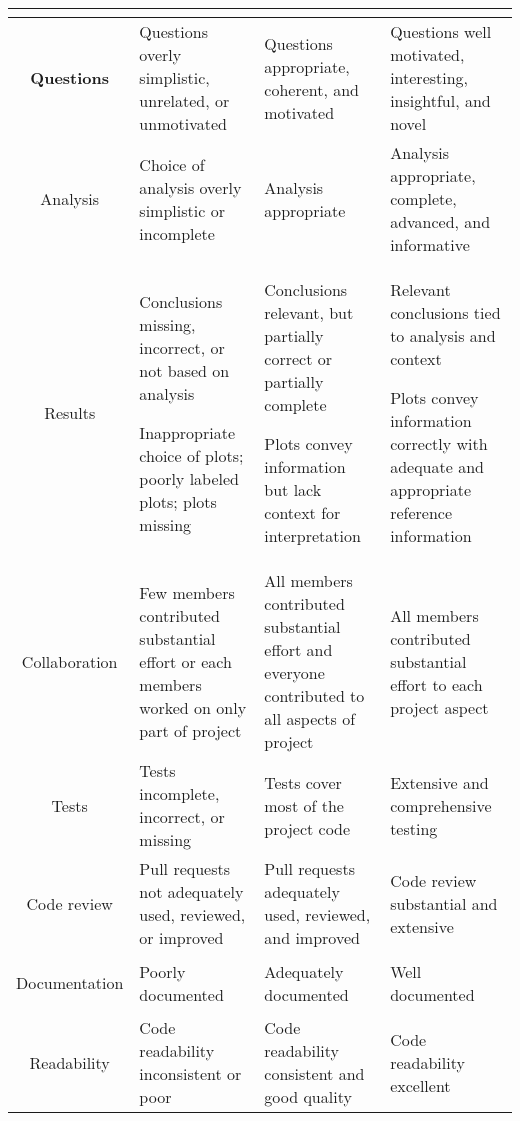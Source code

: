 \begin{tabular}{|>{\bf}c|>{\raggedright}p{4cm}|>{\raggedright}p{4cm}|>{\raggedright\arraybackslash}p{4cm}|}
\hline
 & 
\multicolumn{1}{c|}{\textbf{\ding{51}-}}
 & 
\multicolumn{1}{c|}{\textbf{\ding{51}}}
 & 
\multicolumn{1}{c|}{\textbf{\ding{51}+}}
 \\
\hline

Questions
 & 
Questions overly simplistic, unrelated, or unmotivated
 & 
Questions appropriate, coherent, and motivated
 & 
Questions well motivated, interesting, insightful, and novel
 \\
\hline

Analysis
 & 
Choice of analysis overly simplistic or incomplete
 & 
Analysis appropriate
 & 
Analysis appropriate, complete, advanced, and informative
 \\
\hline

Results
 & 
Conclusions missing, incorrect, or not based on analysis

Inappropriate choice of plots; poorly labeled plots; plots missing
 & 
Conclusions relevant, but partially correct or partially complete

Plots convey information but lack context for interpretation
 & 
Relevant conclusions tied to analysis and context

Plots convey information correctly with adequate and appropriate reference information
 \\
\hline

Collaboration
 & 
Few members contributed substantial effort or each members worked on only part of project
 & 
All members contributed substantial effort and everyone contributed to all aspects of project
 & 
All members contributed substantial effort to each project aspect
 \\
\hline

Tests
 & 
Tests incomplete, incorrect, or missing
 & 
Tests cover most of the project code
 & 
Extensive and comprehensive testing
 \\
\hline

Code review
 & 
Pull requests not adequately used, reviewed, or improved
 & 
Pull requests adequately used, reviewed, and improved
 & 
Code review substantial and extensive
 \\
\hline

Documentation
 & 
Poorly documented
 & 
Adequately documented
 & 
Well documented
 \\
\hline

Readability
 & 
Code readability inconsistent or poor
 & 
Code readability consistent and good quality
 & 
Code readability excellent
 \\
\hline


\end{tabular}
